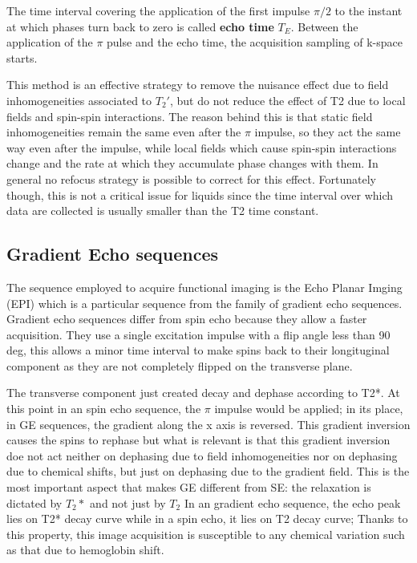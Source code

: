 \documentclass[11pt]{report}
\begin{document}
The time interval covering the application of the first impulse $\pi/2$ to the instant at which phases turn back to zero is called \textbf{echo time} $T_E$.
Between the application of the $\pi$ pulse and the echo time, the acquisition sampling of k-space starts.


This method is an effective strategy to remove the nuisance effect due to field inhomogeneities associated to $T_2'$, but do not reduce the effect of T2 due to local fields and spin-spin interactions. The reason behind this is that static field inhomogeneities remain the same even after the $\pi$ impulse, so they act the same way even after the impulse, while local fields which cause spin-spin interactions change and the rate at which they accumulate phase changes with them. In general no refocus strategy is possible to correct for this effect.
Fortunately though, this is not a critical issue for liquids since the time interval over which data are collected is usually smaller than the T2 time constant.



\subsection{Gradient Echo sequences}
The sequence employed to acquire functional imaging is the Echo Planar Imging (EPI) which is a particular sequence from the family of gradient echo sequences.
Gradient echo sequences differ from spin echo because they allow a faster acquisition.
They use a single excitation impulse with a flip angle less than 90 deg, this allows a minor time interval to make spins back to their longituginal component as they are not completely flipped on the transverse plane.

The transverse component just created decay and dephase according to T2*.
At this point in an spin echo sequence, the $\pi$ impulse would be applied; in its place, in GE sequences, the gradient along the x axis is reversed.
This gradient inversion causes the spins to rephase but what is relevant is that this gradient inversion doe not act neither on dephasing due to field inhomogeneities nor on dephasing due to chemical shifts, but just on dephasing due to the gradient field.
This is the most important aspect that makes GE different from SE: the relaxation is dictated by $T_2*$ and not just by $T_2$
In an gradient echo sequence, the echo peak lies on T2* decay curve while in a spin echo, it lies on T2 decay curve;
Thanks to this property, this image acquisition is susceptible to any chemical variation such as that due to hemoglobin shift.
\end{document}
